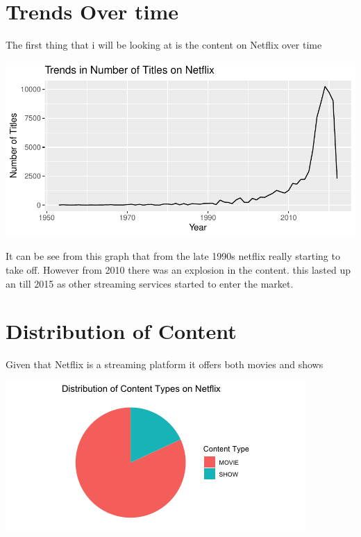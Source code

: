 \documentclass[12pt,preprint, authoryear]{elsarticle}
\let\origfigure\figure
\let\endorigfigure\endfigure
\renewenvironment{figure}[1][2] {
    \expandafter\origfigure\expandafter[H]
} {
    \endorigfigure
}
\numberwithin{equation}{section}
\numberwithin{figure}{section}
\numberwithin{table}{section}
\begin{document}
\hypertarget{trends-over-time}{%
\section{Trends Over time}\label{trends-over-time}}

The first thing that i will be looking at is the content on Netflix over
time

\begin{figure}[H]

{\centering \includegraphics{Q4_files/figure-latex/Figure1-1} 

}

\caption{Content on Netflix over time \label{Figure1}}\label{fig:Figure1}
\end{figure}

It can be see from this graph that from the late 1990s netflix really
starting to take off. However from 2010 there was an explosion in the
content. this lasted up an till 2015 as other streaming services started
to enter the market.

\hypertarget{distribution-of-content}{%
\section{Distribution of Content}\label{distribution-of-content}}

Given that Netflix is a streaming platform it offers both movies and
shows

\begin{figure}[H]

{\centering \includegraphics{Q4_files/figure-latex/Figure2-1} 

}

\caption{Pie chart of content \label{Figure2}}\label{fig:Figure2}
\end{figure}
\end{document}
